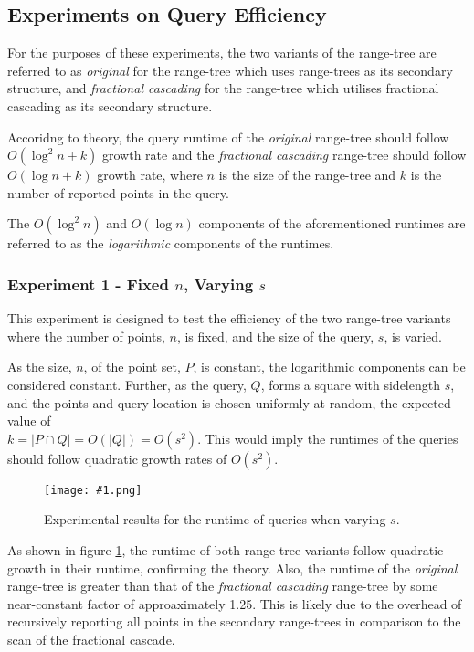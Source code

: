 \documentclass[12pt]{article}
\newcommand{\original}{\textit{original} }
\newcommand{\fc}{\textit{fractional cascading} }
\newcommand{\fig}[2]{
  \begin{figure}[h]
    \centering
    \texttt{[image: \#1.png]}
    \caption{#2}
    \label{fig:#1}
  \end{figure}
}
\begin{document}
\newpage

\subsection*{Experiments on Query Efficiency}
For the purposes of these experiments, the two variants of the range-tree are referred to as \original for the range-tree which uses range-trees as its secondary structure, and \fc for the range-tree which utilises fractional cascading as its secondary structure.

Accoridng to theory, the query runtime of the \original range-tree should follow \\
$O\left( \log^2 n + k \right)$ growth rate and the \fc range-tree should follow $O\left( \log n + k \right)$ growth rate, where $n$ is the size of the range-tree and $k$ is the number of reported points in the query.

The $O\left( \log^2 n \right)$ and $O\left( \log n \right)$ components of the aforementioned runtimes are referred to as the \textit{logarithmic} components of the runtimes.

\subsubsection*{Experiment 1 - Fixed $n$, Varying $s$}
This experiment is designed to test the efficiency of the two range-tree variants where the number of points, $n$, is fixed, and the size of the query, $s$, is varied.

As the size, $n$, of the point set, $P$, is constant, the logarithmic components can be considered constant. Further, as the query, $Q$, forms a square with sidelength $s$, and the points and query location is chosen uniformly at random, the expected value of \\ $k = |P \cap Q| = O\left( |Q| \right) = O\left( s^2 \right)$. This would imply the runtimes of the queries should follow quadratic growth rates of $O \left( s^2 \right)$.

\fig{querys}{Experimental results for the runtime of queries when varying $s$.}

As shown in figure \ref{fig:querys}, the runtime of both range-tree variants follow quadratic growth in their runtime, confirming the theory. Also, the runtime of the \original range-tree is greater than that of the \fc range-tree by some near-constant factor of approaximately 1.25. This is likely due to the overhead of recursively reporting all points in the secondary range-trees in comparison to the scan of the fractional cascade.
\end{document}

